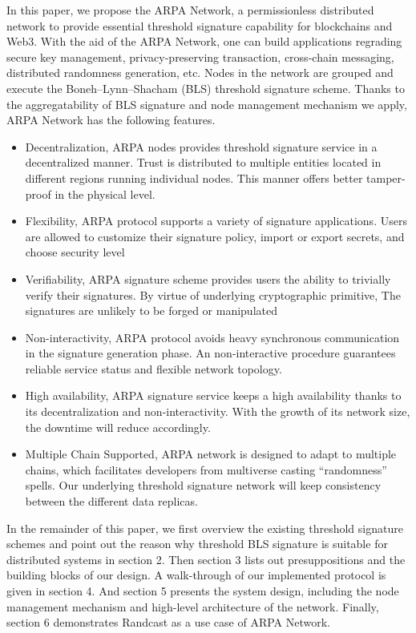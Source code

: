 \documentclass[11pt]{article}
\begin{document}
In this paper, we propose the ARPA Network, a permissionless distributed network to provide essential threshold signature capability for blockchains and Web3. With the aid of the ARPA Network, one can build applications regrading secure key management, privacy-preserving transaction, cross-chain messaging, distributed randomness generation, etc. Nodes in the network are grouped and execute the Boneh–Lynn–Shacham (BLS) threshold signature scheme. Thanks to the aggregatability of BLS signature and node management mechanism we apply, ARPA Network has the following features.
\begin{itemize}
    \item Decentralization, ARPA nodes provides threshold signature service in a decentralized manner. Trust is distributed to multiple entities located in different regions running individual nodes. This manner offers better tamper-proof in the physical level.
    \item Flexibility, ARPA protocol supports a variety of signature applications. Users are allowed to customize their signature policy, import or export secrets, and choose security level
    \item Verifiability, ARPA signature scheme provides users the ability to trivially verify their signatures. By virtue of underlying cryptographic primitive, The signatures are unlikely to be forged or manipulated
    \item Non-interactivity, ARPA protocol avoids heavy synchronous communication in the signature generation phase. An non-interactive procedure guarantees reliable service status and flexible network topology.
    \item High availability, ARPA signature service keeps a high availability thanks to its decentralization and non-interactivity. With the growth of its network size, the downtime will reduce accordingly.
    \item Multiple Chain Supported, ARPA network is designed to adapt to multiple chains, which facilitates developers from multiverse casting “randomness” spells. Our underlying threshold signature network will keep consistency between the different data replicas.
\end{itemize}

In the remainder of this paper, we first overview the existing threshold signature schemes and point out the reason why threshold BLS signature is suitable for distributed systems in section 2. Then section 3 lists out presuppositions and the building blocks of our design. A walk-through of our implemented protocol is given in section 4. And section 5 presents the system design, including the node management mechanism and high-level architecture of the network. Finally, section 6 demonstrates Randcast as a use case of ARPA Network.
\end{document}

